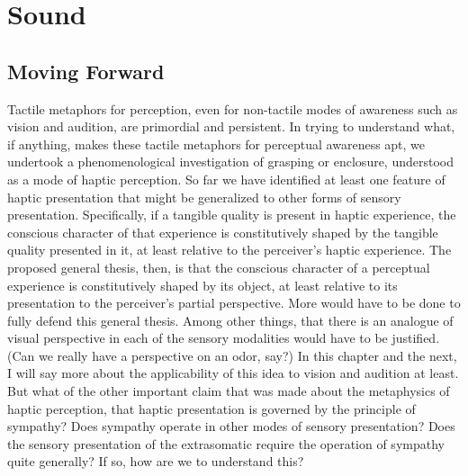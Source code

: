 \chapter{Sound} %
\label{cha:sound}

\section{Moving Forward} %
\label{sec:moving_forward}

Tactile metaphors for perception, even for non-tactile modes of awareness such as vision and audition, are primordial and persistent. In trying to understand what, if anything, makes these tactile metaphors for perceptual awareness apt, we undertook a phenomenological investigation of grasping or enclosure, understood as a mode of haptic perception. So far we have identified at least one feature of haptic presentation that might be generalized to other forms of sensory presentation. Specifically, if a tangible quality is present in haptic experience, the conscious character of that experience is constitutively shaped by the tangible quality presented in it, at least relative to the perceiver's haptic experience. The proposed general thesis, then, is that the conscious character of a perceptual experience is constitutively shaped by its object, at least relative to its presentation to the perceiver's partial perspective. More would have to be done to fully defend this general thesis. Among other things, that there is an analogue of visual perspective in each of the sensory modalities would have to be justified. (Can we really have a perspective on an odor, say?) In this chapter and the next, I will say more about the applicability of this idea to vision and audition at least. But what of the other important claim that was made about the metaphysics of haptic perception, that haptic presentation is governed by the principle of sympathy? Does sympathy operate in other modes of sensory presentation? Does the sensory presentation of the extrasomatic require the operation of sympathy quite generally? If so, how are we to understand this?


